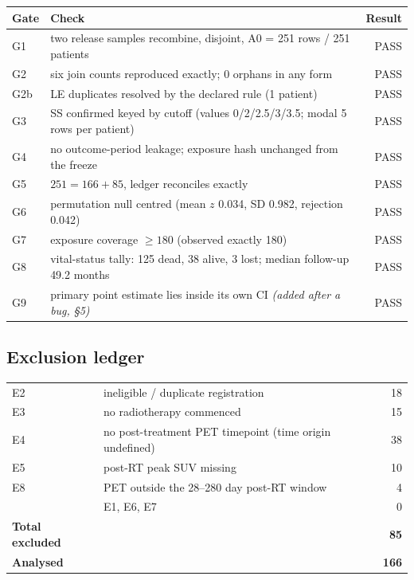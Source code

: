 \documentclass[11pt,a4paper]{article}
\begin{document}
\begin{center}
\begin{tabular}{@{}llr@{}}
\toprule
\textbf{Gate} & \textbf{Check} & \textbf{Result} \\
\midrule
G1 & two release samples recombine, disjoint, A0 = 251 rows / 251 patients & PASS \\
G2 & six join counts reproduced exactly; 0 orphans in any form & PASS \\
G2b & LE duplicates resolved by the declared rule (1 patient) & PASS \\
G3 & SS confirmed keyed by cutoff (values 0/2/2.5/3/3.5; modal 5 rows per patient) & PASS \\
G4 & no outcome-period leakage; exposure hash unchanged from the freeze & PASS \\
G5 & $251 = 166 + 85$, ledger reconciles exactly & PASS \\
G6 & permutation null centred (mean $z$ 0.034, SD 0.982, rejection 0.042) & PASS \\
G7 & exposure coverage $\geq 180$ (observed exactly 180) & PASS \\
G8 & vital-status tally: 125 dead, 38 alive, 3 lost; median follow-up 49.2 months & PASS \\
G9 & primary point estimate lies inside its own CI \emph{(added after a bug, \S5)} & PASS \\
\bottomrule
\end{tabular}
\end{center}

\subsection{Exclusion ledger}

\begin{center}
\begin{tabular}{@{}llr@{}}
\toprule
E2 & ineligible / duplicate registration & 18 \\
E3 & no radiotherapy commenced & 15 \\
E4 & no post-treatment PET timepoint (time origin undefined) & 38 \\
E5 & post-RT peak SUV missing & 10 \\
E8 & PET outside the 28--280 day post-RT window & \phantom{0}4 \\
\midrule
& E1, E6, E7 & \phantom{0}0 \\
\midrule
\textbf{Total excluded} & & \textbf{85} \\
\textbf{Analysed} & & \textbf{166} \\
\bottomrule
\end{tabular}
\end{center}
\end{document}
